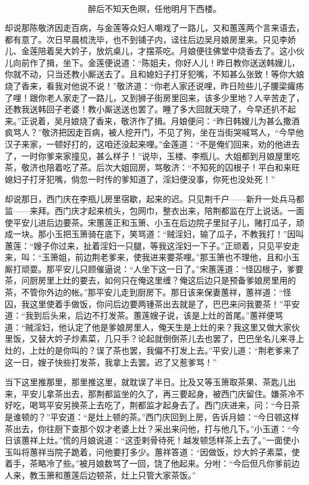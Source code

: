 \[
醉后不知天色暝，任他明月下西楼。
\]

却说那陈敬济因走百病，与金莲等众妇人嘲戏了一路儿，又和蕙莲两个言来语去，都有意了。次日早晨梳洗毕，也不到铺子内，迳往后边吴月娘房里来。只见李娇儿、金莲陪着吴大妗子，放炕桌儿，才摆茶吃。月娘便往佛堂中烧香去了。这小伙儿向前作了揖，坐下。金莲便说道：“陈姐夫，你好人儿！昨日教你送送韩嫂儿，你就不动，只当还教小厮送去了。且和媳妇子打牙犯嘴，不知甚么张致！等你大娘烧了香来，看我对他说不说！”敬济道：“你老人家还说哩，昨日险些儿子腰梁㿚疡了哩！跟你老人家走了一路儿，又到狮子街房里回来，该多少里地？人辛苦走了，还教我送韩回子老婆！教小厮送送也罢了。睡了多大回就天晓了，今早还扒不起来。”正说着，吴月娘烧了香来，敬济作了揖。月娘便问：“昨日韩嫂儿为甚么撒酒疯骂人？”敬济把因走百病，被人挖开门，不见了狗，坐在当街哭喊骂人，“今早他汉子来家，一顿好打的，这咱还没起来哩。”金莲道：“不是俺们回来，劝的他进去了，一时你爹来家撞见，甚么样子！”说毕，玉楼、李瓶儿、大姐都到月娘屋里吃茶，敬济也陪着吃了茶。后次大姐回房，骂敬济：“不知死的囚根子！平白和来旺媳妇子打牙犯嘴，倘忽一时传的爹知道了，淫妇便没事，你死也没处死！”

却说那日，西门庆在李瓶儿房里宿歇，起来的迟。只见荆千户——新升一处兵马都监——来拜。西门庆才起来梳头，包网巾，整衣出来，陪荆都监在厅上说话。一面使平安儿进后边要茶。宋蕙莲正和玉箫、小玉在后边院子里挝子儿，赌打瓜子，顽成一块。那小玉把玉箫骑在底下，笑骂道：“贼淫妇，输了瓜子，不教我打！”因叫蕙莲：“嫂子你过来，扯着淫妇一只腿，等我这淫妇一下子。”正顽着，只见平安走来，叫：“玉箫姐，前边荆老爹来，使我进来要茶哩。”那玉箫也不理他，且和小玉厮打顽耍。那平安儿只顾催逼说：“人坐下这一日了。”宋蕙莲道：“怪囚根子，爹要茶，问厨房里上灶的要去，如何只在俺这里缠？俺这后边只是预备爹娘房里用的茶，不管你外边的帐。”那平安儿走到厨房下。那日该来保妻蕙祥，蕙祥道：“怪囚，我这里使着手做饭，你问后边要两锺茶出去就是了，巴巴来问我要茶！”平安道：“我到后头来，后边不打发茶。蕙莲嫂子说，该是上灶的首尾。”蕙祥便骂道：“贼淫妇，他认定了他是爹娘房里人，俺天生是上灶的来？我这里又做大家伙里饭，又替大妗子炒素菜，几只手？论起就倒倒茶儿去也罢了，巴巴坐名儿来寻上灶的，上灶的是你叫的？误了茶也罢，我偏不打发上去。”平安儿道：“荆老爹来了这一日，嫂子快些打发茶，我拿上去罢。迟了又惹爹骂！”

当下这里推那里，那里推这里，就耽误了半日。比及又等玉箫取茶果、茶匙儿出来，平安儿拿茶出去，那荆都监坐的久了，再三要起身，被西门庆留住。嫌茶冷不好吃，喝骂平安另换茶上去吃了，荆都监才起身去了。西门庆进来，问：“今日茶是谁顿的？”平安道：“是灶上顿的茶。”西门庆回到上房，告诉月娘：“今日顿这样茶出去，你往厨下查那个奴才老婆上灶？采出来问他，打与他几下。”小玉道：“今日该蕙祥上灶。”慌的月娘说道：“这歪剌骨待死！越发顿恁样茶上去了。”一面使小玉叫将蕙祥当院子跪着，问他要打多少。蕙祥答道：“因做饭，炒大妗子素菜，使着手，茶略冷了些。”被月娘数骂了一回，饶了他起来。分咐：“今后但凡你爹前边人来，教玉箫和蕙莲后边顿茶，灶上只管大家茶饭。”

